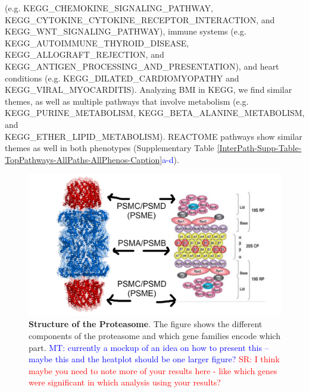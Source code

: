 \documentclass[12pt,a4paper]{article}
\begin{document}
(e.g. KEGG\_CHEMOKINE\_SIGNALING\_PATHWAY, KEGG\_CYTOKINE\_CYTOKINE\_RECEPTOR\_INTERACTION, and \\ KEGG\_WNT\_SIGNALING\_PATHWAY), immune systems (e.g. \\ KEGG\_AUTOIMMUNE\_THYROID\_DISEASE, KEGG\_ALLOGRAFT\_REJECTION, and KEGG\_ANTIGEN\_PROCESSING\_AND\_PRESENTATION), and heart conditions (e.g. KEGG\_DILATED\_CARDIOMYOPATHY and \\ KEGG\_VIRAL\_MYOCARDITIS). Analyzing BMI in KEGG, we find similar themes, as well as multiple pathways that involve metabolism (e.g. KEGG\_PURINE\_METABOLISM, KEGG\_BETA\_ALANINE\_METABOLISM, and \\ KEGG\_ETHER\_LIPID\_METABOLISM). REACTOME pathways show similar themes as well in both phenotypes (Supplementary Table \ref{InterPath-Supp-Table-TopPathways-AllPaths-AllPhenos-Caption}\textcolor{blue}{a-d}).


\begin{figure}[htb]
\centering
\includegraphics[scale=.2]{Images/Main/MockUp1.png}
\caption[TBD]{\textbf{Structure of the Proteasome}. The figure shows the different components of the proteasome and which gene families encode which part. \textcolor{blue}{MT: currently a mockup of an idea on how to present this -- maybe this and the heatplot should be one larger figure? } \textcolor{red}{SR: I think maybe you need to note more of your results here - like which genes were significant in which analysis using your results?}
}
\label{InterPath-Main-Figure-Proteasome-Schematic}
\end{figure}

\fi
\end{document}
